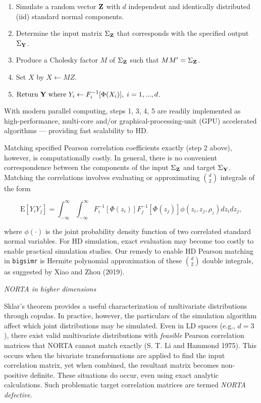 \documentclass{article}
\begin{document}
\begin{enumerate}
\def\labelenumi{\arabic{enumi}.}
\tightlist
\item
  Simulate a random vector \(\bf Z\) with \(d\) independent and
  identically distributed (iid) standard normal components.
\item
  Determine the input matrix \(\Sigma_{\bf Z}\) that corresponds with
  the specified output \(\Sigma_{\bf Y}\).
\item
  Produce a Cholesky factor \(M\) of \(\Sigma_{\bf Z}\) such that
  \(M M^{\prime}=\Sigma_{\bf Z}\).
\item
  Set \(X\) by \(X \gets MZ\).
\item
  \(\text{Return} \; {\bf Y} \; \text{where} \; Y_i \gets F_i^{-1}[\Phi(X_i)], \; i=1,...,d\).
\end{enumerate}

With modern parallel computing, steps 1, 3, 4, 5 are readily implemented
as high-performance, multi-core and/or graphical-processing-unit (GPU)
accelerated algorithms --- providing fast scalability to HD.

Matching specified Pearson correlation coefficients exactly (step 2
above), however, is computationally costly. In general, there is no
convenient correspondence between the components of the input
\(\Sigma_{\bf Z}\) and target \(\Sigma_{\bf Y}\). Matching the
correlations involves evaluating or approximating \(\binom{d}{2}\)
integrals of the form

\begin{equation}
    \mathrm{E}\left[Y_i Y_j\right] = \int_{-\infty}^{\infty} \int_{-\infty}^{\infty} F_i^{-1}\left[\Phi(z_i)\right] F_j^{-1}\left[\Phi(z_j)\right] \phi(z_i, z_j, \rho_z) dz_i dz_j,
    \label{eq:pearsonIntegralRelation}
\end{equation}

where \(\phi(\cdot)\) is the joint probability density function of two
correlated standard normal variables. For HD simulation, exact
evaluation may become too costly to enable practical simulation studies.
Our remedy to enable HD Pearson matching in \texttt{bigsimr} is Hermite
polynomial approximation of these \(\binom{d}{2}\) double integrals, as
suggested by Xiao and Zhou (2019).

\emph{NORTA in higher dimensions}

Sklar's theorem provides a useful characterization of multivariate
distributions through copulas. In practice, however, the particulars of
the simulation algorithm affect which joint distributions may be
simulated. Even in LD spaces (e.g., \(d=3\)), there exist valid
multivariate distributions with \emph{feasible} Pearson correlation
matrices that NORTA cannot match exactly (S. T. Li and Hammond 1975).
This occurs when the bivariate transformations are applied to find the
input correlation matrix, yet when combined, the resultant matrix
becomes non-positive definite. These situations do occur, even using
exact analytic calculations. Such problematic target correlation
matrices are termed \emph{NORTA defective}.
\end{document}
